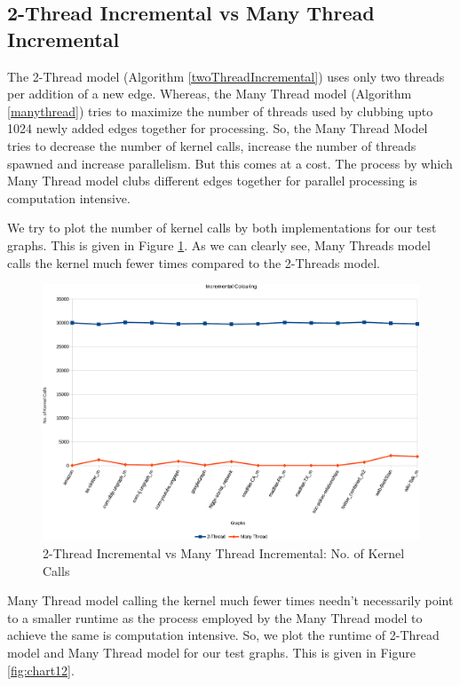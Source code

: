 \documentclass[MTech]{iitmdiss}
\begin{document}
\subsection{2-Thread Incremental vs Many Thread Incremental}
The 2-Thread model (Algorithm \ref{twoThreadIncremental}) uses only two threads per addition of a new edge. Whereas, the Many Thread model (Algorithm \ref{manythread}) tries to maximize the number of threads used by clubbing upto 1024 newly added edges together for processing. So, the Many Thread Model tries to decrease the number of kernel calls, increase the number of threads spawned and increase parallelism. But this comes at a cost. The process by which Many Thread model clubs different edges together for parallel processing is computation intensive.

We try to plot the number of kernel calls by both implementations for our test graphs. This is given in Figure \ref{fig:chart11}. As we can clearly see, Many Threads model calls the kernel much fewer times compared to the 2-Threads model. 

\begin{figure}[h]
    \centering
    \includegraphics[width=\textwidth,keepaspectratio=true]{chartNewest24.pdf}
    \caption{
        2-Thread Incremental vs Many Thread Incremental: No. of Kernel Calls
    }
    \label{fig:chart11}
\end{figure}

Many Thread model calling the kernel much fewer times needn't necessarily point to a smaller runtime as the process employed by the Many Thread model to achieve the same is computation intensive. So, we plot the runtime of 2-Thread model and Many Thread model for our test graphs. This is given in Figure \ref{fig:chart12}.
\end{document}
